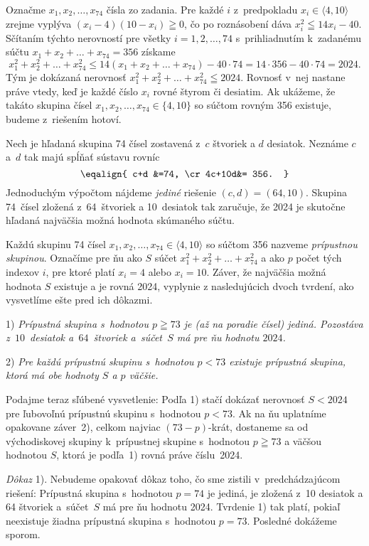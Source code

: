 {%
Označme $x_1, x_2,\dots, x_{74}$ čísla zo zadania. Pre každé $i$
z~predpokladu $x_i\in\langle4,10\rangle$ zrejme
vyplýva $(x_i-4)(10-x_i)\geqq0$,
čo po roznásobení dáva $x_i^2\leqq 14x_i-40$.
Sčítaním týchto nerovností pre všetky $i=1,2,\ldots,74$
s~prihliadnutím k~zadanému súčtu $x_1+x_2+\ldots+x_{74}=356$
získame
$$
  x_1 ^2 + x_2 ^2 + \ldots + x_{74} ^2 \leq 14 (x_1 + x_2 + \dots + x_{74}) -
40 \cdot 74 = 14 \cdot 356 - 40 \cdot 74 = 2024.
$$
Tým je dokázaná nerovnosť $x_1 ^2+x_2 ^2+\ldots+x_{74} ^2\leqq2024$.
Rovnosť v~nej nastane práve vtedy, keď je každé číslo $x_i$ rovné štyrom či desiatim.
Ak ukážeme, že takáto skupina čísel $x_1, x_2,\dots, x_{74}\in\{4,10\}$
so súčtom rovným 356 existuje, budeme z~riešením hotoví.

Nech je hľadaná skupina 74 čísel zostavená z~$c$ štvoriek a $d$
desiatok. Neznáme $c$ a~$d$ tak majú spĺňať sústavu rovníc
$$\eqalign{
c+d &=74, \cr
4c+10d&= 356.
}$$
Jednoduchým výpočtom nájdeme \emph{jediné} riešenie $(c,d)=(64,10)$. Skupina
74~čísel zložená z~64~štvoriek a 10~desiatok tak zaručuje, že 2024 je
skutočne hľadaná najväčšia možná hodnota skúmaného súčtu.

\ineriesenie
Každú skupinu 74 čísel
$x_1,x_2,\dots,x_{74}\in\langle4,10\rangle$ so súčtom 356
nazveme \emph{prípustnou skupinou}. Označíme pre ňu ako $S$ súčet
$x_1^2+x_2^2+\ldots+x_{74}^2$ a ako $p$ počet tých indexov $i$,
pre ktoré platí $x_i=4$ alebo $x_i=10$. Záver, že najväčšia možná
hodnota $S$ existuje
a je rovná 2024, vyplynie z nasledujúcich dvoch tvrdení,
ako vysvetlíme ešte pred ich dôkazmi.

\smallskip
\item{1)} {\sl Prípustná skupina s~hodnotou $p\geqq73$ je (až na poradie čísel)
jediná. Pozostáva z~$10$~desiatok
a~$64$~štvoriek a~súčet~$S$ má pre ňu hodnotu $2024$.}
\item{2)} {\sl Pre každú prípustnú skupinu s~hodnotou $p<73$ existuje
prípustná skupina, ktorá má obe hodnoty $S$ a $p$ väčšie.}

\smallskip\noindent
Podajme teraz sľúbené vysvetlenie: Podľa 1) stačí dokázať
nerovnosť $S<2024$ pre ľubovoľnú prípustnú skupinu s~hodnotou
$p<73$. Ak na ňu uplatníme opakovane záver~2), celkom najviac
$(73-p)$-krát, dostaneme sa od východiskovej skupiny k~prípustnej skupine
s~hodnotou $p\geqq73$ a väčšou hodnotou $S$, ktorá je podľa~1)
rovná práve číslu~2024.

\smallskip
\emph{Dôkaz} 1). Nebudeme opakovať dôkaz toho, čo sme
zistili v~predchádzajúcom riešení: Prípustná skupina s~hodnotou $p=74$ je
jediná, je zložená z~10 desiatok a 64 štvoriek a~súčet~$S$ má pre
ňu hodnotu 2024. Tvrdenie 1) tak platí, pokiaľ neexistuje
žiadna prípustná skupina s~hodnotou $p=73$. Posledné dokážeme
sporom.

}
